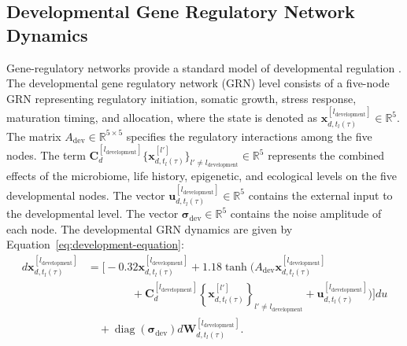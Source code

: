 \documentclass[11pt]{article}
\begin{document}
\subsection{Developmental Gene Regulatory Network Dynamics}
Gene-regulatory networks provide a standard model of developmental regulation \cite{dejong2002}. The developmental gene regulatory network (GRN) level consists of a five-node GRN representing regulatory initiation, somatic growth, stress response, maturation timing, and allocation, where the state is denoted as $\mathbf{x}^{[l_{\mathrm{development}}]}_{d,t_l(\tau)}\in\mathbb{R}^5$. The matrix $A_{\mathrm{dev}}\in\mathbb{R}^{5\times5}$ specifies the regulatory interactions among the five nodes. The term $\mathbf{C}_{d}^{[l_{\mathrm{development}}]}\{\mathbf{x}_{d,t_l(\tau)}^{[l']}\}_{l'\neq l_{\mathrm{development}}}\in\mathbb{R}^5$ represents the combined effects of the microbiome, life history, epigenetic, and ecological levels on the five developmental nodes. The vector $\mathbf{u}^{[l_{\mathrm{development}}]}_{d,t_l(\tau)}\in\mathbb{R}^5$ contains the external input to the developmental level. The vector $\boldsymbol{\sigma}_{\mathrm{dev}}\in\mathbb{R}^5$ contains the noise amplitude of each node. The developmental GRN dynamics are given by Equation~\ref{eq:development-equation}:
\begin{equation}
\begin{aligned}
d\mathbf{x}^{[l_{\mathrm{development}}]}_{d,t_l(\tau)}
&=
\Bigg[
-0.32
\mathbf{x}^{[l_{\mathrm{development}}]}_{d,t_l(\tau)}
+
1.18\tanh\!\Bigg(
A_{\mathrm{dev}}
\mathbf{x}^{[l_{\mathrm{development}}]}_{d,t_l(\tau)}
\\
&\qquad\qquad+
\mathbf{C}_{d}^{[l_{\mathrm{development}}]}
\left\{
\mathbf{x}_{d,t_l(\tau)}^{[l']}
\right\}_{l'\neq l_{\mathrm{development}}}
+
\mathbf{u}^{[l_{\mathrm{development}}]}_{d,t_l(\tau)}
\Bigg)
\Bigg]du
\\
&\quad+
\operatorname{diag}(\boldsymbol{\sigma}_{\mathrm{dev}})
d\mathbf{W}^{[l_{\mathrm{development}}]}_{d,t_l(\tau)} .
\end{aligned}
\label{eq:development-equation}
\end{equation}
\end{document}
